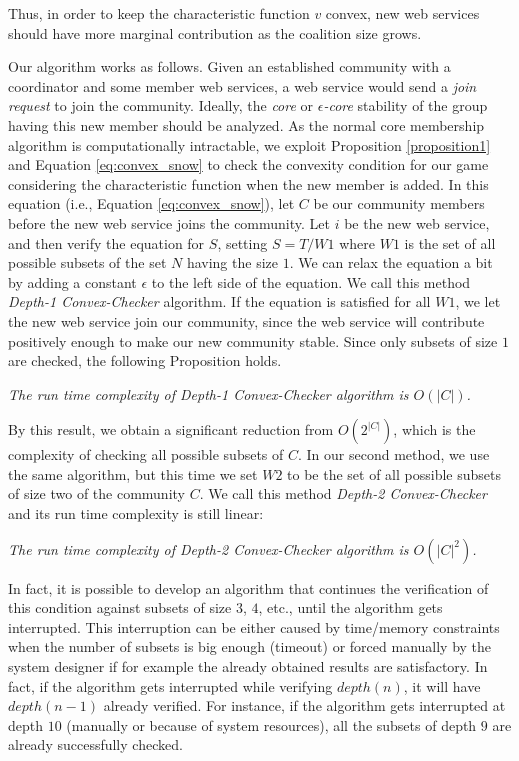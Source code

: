 \documentclass[10pt,journal,cspaper,compsoc]{IEEEtran}
\begin{document}
Thus, in order to keep the characteristic function $v$ convex, new
web services should have more marginal contribution as the
coalition size grows.

Our algorithm works as follows. Given an established community
with a coordinator and some member web services, a web service would
send a \emph{join request} to join  the community. Ideally, the
\emph{core} or \emph{$\epsilon$-core} stability of the group
having this new member should be analyzed. As the normal core
membership algorithm is computationally intractable, we exploit
Proposition \ref{proposition1} and Equation \ref{eq:convex_snow}
to check the convexity condition for our game considering the characteristic function
when the new member is added. In this equation (i.e., Equation
\ref{eq:convex_snow}), let $C$ be our community members before the
new web service joins the community. Let  ${i}$ be the new web
service, and then verify the equation for $S$, setting $ S = T /
W1 $ where $W1$ is the set of all possible subsets of the set $N$
having the size $1$. We can relax the equation a bit by adding a
constant $\epsilon$ to the left side of the equation. We call this
method \emph{Depth-1 Convex-Checker} algorithm. If the equation is
satisfied for all $W1$, we let the new web service join our
community, since the web service will contribute positively enough
to make our new community stable. Since only subsets of size $1$
are checked, the following Proposition holds.

\begin{theorem}\label{complexity1}
\emph{The run time complexity of Depth-1 Convex-Checker algorithm
is $O(|C|)$.}
\end{theorem}

By this result, we obtain a significant reduction from
$O(2^{|C|})$, which is the complexity of checking all possible
subsets of $C$. In our second method, we use the same algorithm,
but this time we set $W2$ to be the set of all possible subsets of
size two of the community $C$. We call this method \emph{Depth-2
Convex-Checker} and its run time complexity is still linear:

\begin{theorem}\label{complexity2}
\emph{The run time complexity of Depth-2 Convex-Checker algorithm
is $O(|C|^2)$.}
\end{theorem}

In fact, it is possible to develop an algorithm that continues the
verification of this condition against subsets of size $3$, $4$,
etc., until the algorithm gets interrupted. This interruption can
be either caused by time/memory constraints when the number of
subsets is big enough (timeout) or forced manually by the system
designer if for example the already obtained results are
satisfactory. In fact, if the algorithm gets interrupted while
verifying $depth(n)$, it will have $depth(n-1)$ already verified.
For instance, if the algorithm gets interrupted at depth $10$
(manually or because of system resources), all the subsets of
depth $9$ are already successfully checked.
\end{document}
